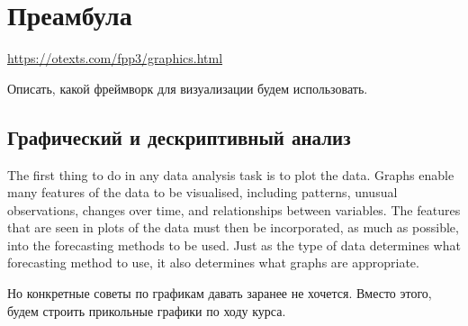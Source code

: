 \chapter{Преамбула}
\url{https://otexts.com/fpp3/graphics.html}

Описать, какой фреймворк для визуализации будем использовать.

\section{Графический и дескриптивный анализ}

The first thing to do in any data analysis task is to plot the data.
Graphs enable many features of the data to be visualised, including
patterns, unusual observations, changes over time, and relationships
between variables. The features that are seen in plots of the data
must then be incorporated, as much as possible, into the forecasting
methods to be used. Just as the type of data determines what
forecasting method to use, it also determines what graphs are appropriate.

Но конкретные советы по графикам давать заранее не хочется. Вместо
этого, будем строить прикольные графики по ходу курса.